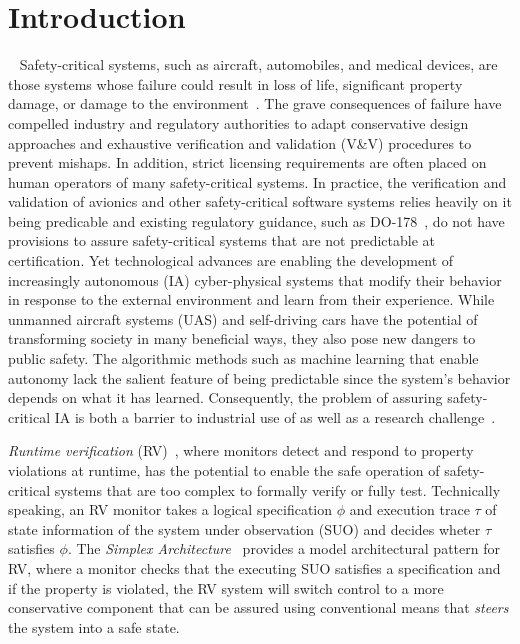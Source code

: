 \section{Introduction}~\label{sec:intro} 
Safety-critical systems, such as aircraft, automobiles, and medical
devices, are those systems whose failure could result
in loss of life, significant property damage, or damage to the
environment~\cite{Knight2002}.  The  grave consequences of failure have compelled
industry and regulatory authorities  to adapt conservative design
approaches and exhaustive verification and validation (V\&V) procedures
to prevent mishaps. In addition, strict licensing requirements are
often placed on human operators of  many safety-critical systems.
In practice, the verification and validation of avionics
and other safety-critical software systems relies heavily on it being
predicable and existing regulatory guidance,  such as
DO-178~\cite{DO178B},  do not  have provisions to
assure safety-critical systems that are not predictable at certification. 
Yet technological advances are enabling the development of increasingly
autonomous (IA) cyber-physical  systems that modify their behavior in response
to the external environment and learn from their experience.  While
unmanned aircraft systems (UAS) and self-driving cars have the
potential of transforming society in many beneficial ways, they also
pose new dangers to public safety. The algorithmic methods such as
machine learning that enable autonomy lack the salient feature of
being predictable since the system's behavior depends on what it has
learned.  Consequently, the  problem  of assuring safety-critical IA is
both a barrier to industrial use of  as well as a research challenge~\cite{NRC14}.


\emph{Runtime verification} (RV)~\cite{monitors}, where monitors
detect and respond to property violations at runtime, has the
potential to enable the safe operation of safety-critical systems that
are too complex to formally verify or fully test.  Technically
speaking, an RV monitor takes a logical specification $\phi$ and
execution trace $\tau$ of state information of the system under
observation (SUO) and decides wheter $\tau$ satisfies $\phi$. The
\emph{Simplex Architecture}~\cite{simplex} provides a model
architectural pattern for RV, where a monitor checks that the
executing SUO satisfies a specification and if the property is
violated, the RV system will switch control to a more conservative
component that can be assured using conventional means that
\emph{steers} the system into a safe state.

